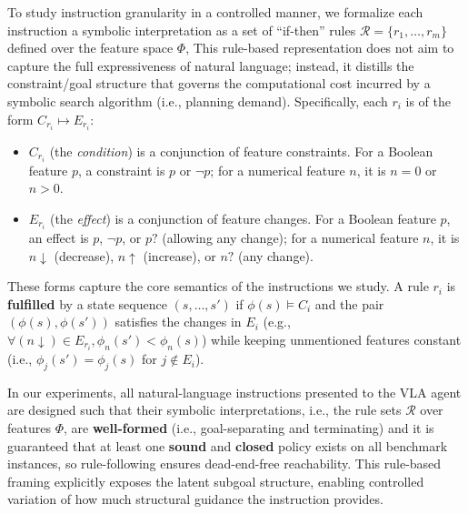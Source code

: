 \documentclass{article}
\begin{document}
To study instruction granularity in a controlled manner, we formalize each instruction a symbolic interpretation as a set of ``if-then'' rules $\mathcal R = \{r_1,\ldots, r_m\}$ defined over the feature space $\Phi$, This rule-based representation does not aim to capture the full expressiveness of natural language; instead, it distills the constraint/goal structure that governs the computational cost incurred by a symbolic search algorithm (i.e., planning demand). Specifically, each $r_i$ is of the form $C_{r_i} \mapsto E_{r_i}$:
\begin{itemize}
    \item $C_{r_i}$ (the \emph{condition}) is a conjunction of feature constraints. For a Boolean feature $p$, a constraint is $p$ or $\lnot p$; for a numerical feature $n$, it is $n = 0$ or $n > 0$.
    \item $E_{r_i}$ (the \emph{effect}) is a conjunction of feature changes. For a Boolean feature $p$, an effect is $p$, $\lnot p$, or $p?$ (allowing any change); for a numerical feature $n$, it is $n\downarrow$ (decrease), $n\uparrow$ (increase), or $n?$ (any change).
\end{itemize}
These forms capture the core semantics of the instructions we study. A rule $r_i$ is \textbf{fulfilled} by a state sequence $(s, \dots, s')$ if $\phi(s) \models C_i$ and the pair $(\phi(s), \phi(s'))$ satisfies the changes in $E_i$ (e.g., $\forall (n \downarrow) \in E_{r_i}, \phi_n(s') < \phi_n(s)$) while keeping unmentioned features constant (i.e., $\phi_j(s') = \phi_j(s)$ for $j \notin E_i$).

In our experiments, all natural-language instructions presented to the VLA agent are designed such that their symbolic interpretations, i.e., the rule sets $\mathcal R$ over features $\Phi$, are \textbf{well-formed} (i.e., goal-separating and terminating) and it is guaranteed that at least one \textbf{sound} and \textbf{closed} \cite{DBLP:conf/aaai/BonetG21} policy exists on all benchmark instances, so rule-following ensures dead-end-free reachability. This rule-based framing explicitly exposes the latent subgoal structure, enabling controlled variation of how much structural guidance the instruction provides.
\end{document}

